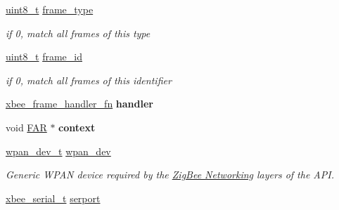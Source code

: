 \begin{DoxyCompactItemize}
\item 
\mbox{\label{group__xbee__device_gafa34d393db5fa915716b483011415ddc}} 
\hyperlink{group__hal__dos_gae1affc9ca37cfb624959c866a73f83c2}{uint8\+\_\+t} \hyperlink{group__xbee__device_gafa34d393db5fa915716b483011415ddc}{frame\+\_\+type}
\begin{DoxyCompactList}\small\item\em if 0, match all frames of this type \end{DoxyCompactList}\item 
\mbox{\label{group__xbee__device_ga03c1016ac46b9df250b994f242cf956a}} 
\hyperlink{group__hal__dos_gae1affc9ca37cfb624959c866a73f83c2}{uint8\+\_\+t} \hyperlink{group__xbee__device_ga03c1016ac46b9df250b994f242cf956a}{frame\+\_\+id}
\begin{DoxyCompactList}\small\item\em if 0, match all frames of this identifier \end{DoxyCompactList}\item 
\mbox{\label{group__xbee__device_gacae6128cc991ffaa526063adc6dd9fe8}} 
\hyperlink{group__xbee__device_ga3e6f2b540e8cec7a69ef0b0166da14ff}{xbee\+\_\+frame\+\_\+handler\+\_\+fn} {\bfseries handler}
\item 
\mbox{\label{group__xbee__device_gaa91f8e864e06077c354e5f5216547758}} 
void \hyperlink{group__hal_gaef060b3456fdcc093a7210a762d5f2ed}{F\+AR} $\ast$ {\bfseries context}
\item 
\mbox{\label{group__xbee__device_ga8547395da056b57ba7c6b26c0c0f6ccf}} 
\hyperlink{structwpan__dev__t}{wpan\+\_\+dev\+\_\+t} \hyperlink{group__xbee__device_ga8547395da056b57ba7c6b26c0c0f6ccf}{wpan\+\_\+dev}
\begin{DoxyCompactList}\small\item\em Generic W\+P\+AN device required by the \hyperlink{group__zigbee}{Zig\+Bee Networking} layers of the A\+PI. \end{DoxyCompactList}\item 
\mbox{\label{group__xbee__device_ga3145a7888ffabfc3f10e8e85ced0c686}} 
\hyperlink{structxbee__serial__t}{xbee\+\_\+serial\+\_\+t} \hyperlink{group__xbee__device_ga3145a7888ffabfc3f10e8e85ced0c686}{serport}

\end{DoxyCompactItemize}
